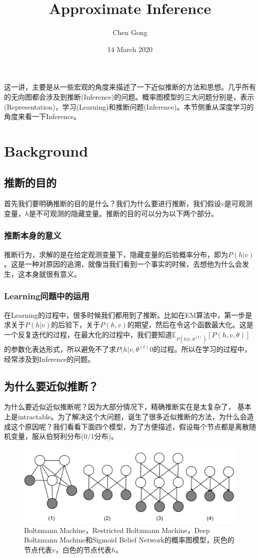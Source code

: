 \documentclass[a4paper]{article}
\title{Approximate Inference}
\author{Chen Gong}
\date{14 March 2020}
\begin{document}
\maketitle
\tableofcontents
\newpage
\setcounter{page}{1} %
\clearpage

这一讲，主要是从一些宏观的角度来描述了一下近似推断的方法和思想。几乎所有的无向图都会涉及到推断(Inference)的问题。概率图模型的三大问题分别是，表示(Representation)，学习(Learning)和推断问题(Inference)。本节侧重从深度学习的角度来看一下Inference。
\section{Background}
\subsection{推断的目的}
首先我们要明确推断的目的是什么？我们为什么要进行推断，我们假设$v$是可观测变量，$h$是不可观测的隐藏变量。推断的目的可以分为以下两个部分。
\subsubsection{推断本身的意义}
推断行为，求解的是在给定观测变量下，隐藏变量的后验概率分布，即为$P(h|v)$。这是一种对原因的追溯，就像当我们看到一个事实的时候，去想他为什么会发生，这本身就很有意义。
\subsubsection{Learning问题中的运用}
在Learning的过程中，很多时候我们都用到了推断。比如在EM算法中，第一步是求关于$P(h|v)$的后验下，关于$P(h,v)$的期望，然后在令这个函数最大化。这是一个反复迭代的过程，在最大化的过程中，我们要知道$\mathbb{E}_{P(h|v,\theta^{(t)})}[P(h,v,\theta)]$的参数化表达形式，所以避免不了求$P(h|v,\theta^{(t)}0$的过程。所以在学习的过程中，经常涉及到Inference的问题。

\subsection{为什么要近似推断？}
为什么要近似近似推断呢？因为大部分情况下，精确推断实在是太复杂了，
基本上是intractable。为了解决这个大问题，诞生了很多近似推断的方法，为什么会造成这个原因呢？我们看看下面四个模型，为了方便描述，假设每个节点都是离散随机变量，服从伯努利分布(0/1分布)。
\begin{figure}[H]
    \centering
    \includegraphics[width=.9\textwidth]{微信图片_20200315123116.png}
    \caption{Boltzmann Machine，Restricted Boltzmann Machine，Deep Boltzmann Machine和Sigmoid Belief Network的概率图模型，灰色的节点代表$v$，白色的节点代表$h$。}
    \label{fig:my_label_1}
\end{figure}
\end{document}
